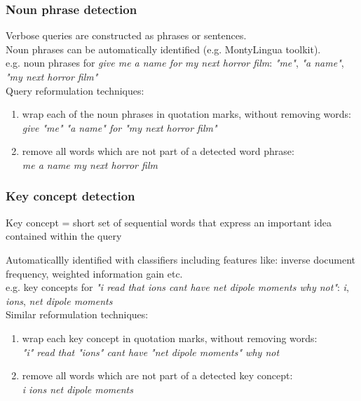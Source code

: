 \begin{frame}
\frametitle{Noun phrase detection}
Verbose queries are constructed as phrases or sentences.\\
\vskip10pt
Noun phrases can be automatically identified (e.g. MontyLingua toolkit).\\
e.g. noun phrases for \textit{give me a name for my next horror film}: \textit{"me"}, \textit{"a name"}, \textit{"my next horror film"}\\
\vskip10pt
Query reformulation techniques:\\
\begin{enumerate}
\item
wrap each of the noun phrases in quotation marks, without removing words:\\
\textit{give "me" "a name" for "my next horror film"}
\item
remove all words which are not part of a detected word phrase:\\
\textit{me a name my next horror film}
\end{enumerate}
\end{frame}

\begin{frame}
\frametitle{Key concept detection}
\begin{block}
{Key concept = short set of sequential words that express an important idea contained within the query}
\end{block}
Automaticallly identified with classifiers including features like: inverse document frequency, weighted information gain etc.\\
e.g. key concepts for \textit{"i read that ions cant have net dipole moments why not"}: \textit{i}, \textit{ions}, \textit{net dipole moments}\\
\vskip10pt 
Similar reformulation techniques:\\
\begin{enumerate}
\item
wrap each key concept in quotation marks, without removing words:\\
\textit{"i" read that "ions" cant have "net dipole moments" why not}
\item
remove all words which are not part of a detected key concept:\\
\textit{i ions net dipole moments}
\end{enumerate}

\end{frame}


